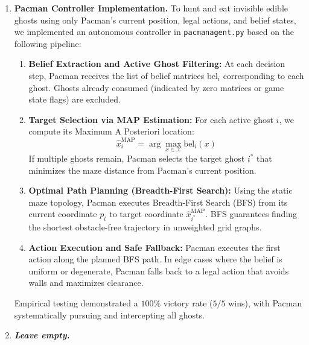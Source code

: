\documentclass{article}
\begin{document}
\begin{enumerate}[label=\alph*.,leftmargin=*]
    \item \textbf{Pacman Controller Implementation.}
    To hunt and eat invisible edible ghosts using only Pacman's current position, legal actions, and belief states, we implemented an autonomous controller in \texttt{pacmanagent.py} based on the following pipeline:
    \begin{enumerate}[leftmargin=*]
        \item \textbf{Belief Extraction and Active Ghost Filtering:} At each decision step, Pacman receives the list of belief matrices $\text{bel}_i$ corresponding to each ghost. Ghosts already consumed (indicated by zero matrices or game state flags) are excluded.
        \item \textbf{Target Selection via MAP Estimation:} For each active ghost $i$, we compute its Maximum A Posteriori location:
        \begin{equation}
            \hat{x}_i^{\text{MAP}} = \arg\max_{x \in \mathcal{X}} \text{bel}_i(x)
        \end{equation}
        If multiple ghosts remain, Pacman selects the target ghost $i^*$ that minimizes the maze distance from Pacman's current position.
        \item \textbf{Optimal Path Planning (Breadth-First Search):} Using the static maze topology, Pacman executes Breadth-First Search (BFS) from its current coordinate $p_t$ to target coordinate $\hat{x}_{i^*}^{\text{MAP}}$. BFS guarantees finding the shortest obstacle-free trajectory in unweighted grid graphs.
        \item \textbf{Action Execution and Safe Fallback:} Pacman executes the first action along the planned BFS path. In edge cases where the belief is uniform or degenerate, Pacman falls back to a legal action that avoids walls and maximizes clearance.
    \end{enumerate}
    Empirical testing demonstrated a $100\%$ victory rate ($5/5$ wins), with Pacman systematically pursuing and intercepting all ghosts.

    \item \textbf{\textit{Leave empty.}}
\end{enumerate}

\end{document}
